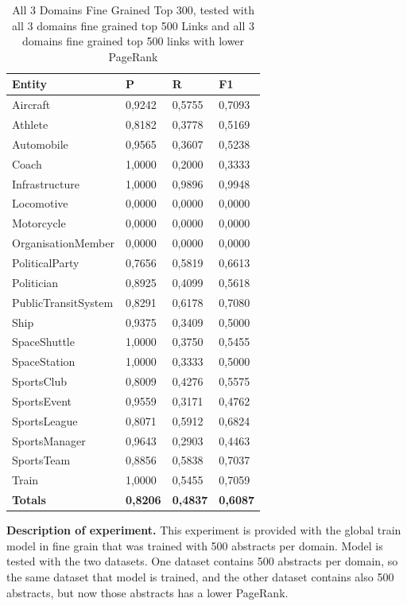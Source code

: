\documentclass[thesis=M,english]{FITthesis}[2018/05/30]
\begin{document}
\begin{table}[H]\centering
		\begin{tabular}{|l|l|l|l|}
			\hline {\textbf{Entity}} & {\textbf{P}} & {\textbf{R}} & {\textbf{F1}}\\\hline
				Aircraft & 0,9242 & 0,5755 & 0,7093\\
				Athlete & 0,8182 & 0,3778 & 0,5169\\
				Automobile & 0,9565 & 0,3607 & 0,5238\\ 
				Coach & 1,0000 & 0,2000 & 0,3333\\
				Infrastructure & 1,0000 & 0,9896 & 0,9948\\
				Locomotive & 0,0000 & 0,0000 & 0,0000\\
				Motorcycle & 0,0000 & 0,0000 & 0,0000\\
				OrganisationMember & 0,0000 & 0,0000 & 0,0000\\				
				PoliticalParty & 0,7656 & 0,5819 & 0,6613\\
				Politician & 0,8925 & 0,4099 & 0,5618\\
				PublicTransitSystem & 0,8291 & 0,6178 & 0,7080\\
				Ship & 0,9375 & 0,3409 & 0,5000\\
				SpaceShuttle & 1,0000 & 0,3750 & 0,5455\\
				SpaceStation & 1,0000 & 0,3333 & 0,5000\\ 
				SportsClub & 0,8009 & 0,4276 & 0,5575\\
				SportsEvent & 0,9559 & 0,3171 & 0,4762\\
				SportsLeague & 0,8071 & 0,5912 & 0,6824\\
				SportsManager & 0,9643 & 0,2903 & 0,4463\\
				SportsTeam & 0,8856 & 0,5838 & 0,7037\\
				Train & 1,0000 & 0,5455 & 0,7059\\\hline
				\textbf{Totals} & \textbf{0,8206} & \textbf{0,4837} & \textbf{0,6087}\\\hline
		\end{tabular}
		\caption{All 3 Domains Fine Grained Top 300, tested with all 3 domains fine grained top 500 Links and all 3 domains fine grained top 500 links with lower PageRank \label{table:Global300FineDomainTestedWithTwo500Datasets}}
	\end{table}

\textbf{Description of experiment.} This experiment is provided with the global train model in fine grain that was trained with 500 abstracts per domain. Model is tested with the two datasets. One dataset contains 500 abstracts per domain, so the same dataset that model is trained, and the other dataset contains also 500 abstracts, but now those abstracts has a lower PageRank. 
\end{document}
